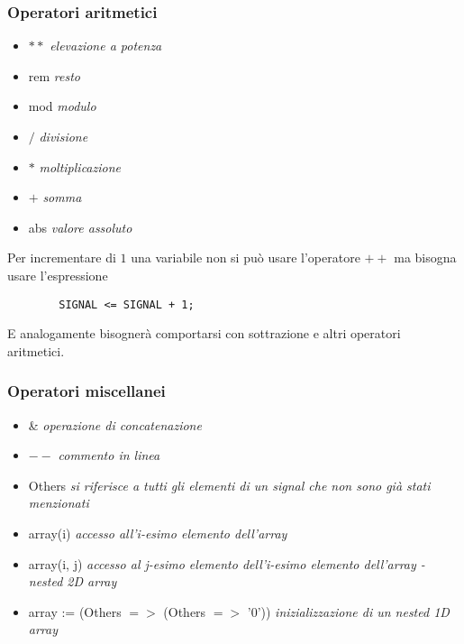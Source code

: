 \documentclass{article}
\begin{document}
\subsubsection{Operatori aritmetici}
\begin{itemize}
	\item \(**\) \textit{elevazione a potenza}
	\item rem \textit{resto}
	\item mod \textit{modulo}
	\item \(/\) \textit{divisione}
	\item \(*\) \textit{moltiplicazione}
	\item \(+\) \textit{somma}
	\item abs \textit{valore assoluto}
	      	
\end{itemize}
Per incrementare di \(1\) una variabile non si può usare l'operatore \(++\) ma bisogna usare l'espressione
\begin{verbatim}
	    SIGNAL <= SIGNAL + 1;
\end{verbatim}
E analogamente bisognerà comportarsi con sottrazione e altri operatori aritmetici.
\subsubsection{Operatori miscellanei} \label{miscellanei}
\begin{itemize}
	\item \& \textit{operazione di concatenazione}
	\item \(--\) \textit{commento in linea}
	\item Others \textit{si riferisce a tutti gli elementi di un signal che non sono già stati menzionati}
	\item array(i) \textit{accesso all'i-esimo elemento dell'array}
	\item array(i, j) \textit{accesso al j-esimo elemento dell'i-esimo elemento dell'array - nested 2D array}
	\item array := (Others \( => \) (Others \( => \) '0')) \textit{inizializzazione di un nested 1D array}
\end{itemize}
	
\newpage
\end{document}
